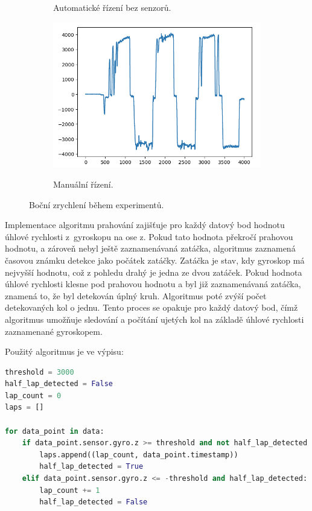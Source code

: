 \begin{figure}[!h]
\begin{subfigure}{.5\textwidth}
        \label{fig:LapsAuto}
        \caption{Automatické řízení bez senzorů.}
    \end{subfigure}
    \begin{subfigure}{.5\textwidth}
        \includegraphics[width = \textwidth]{Figures/LapManual.png}
        \label{fig:LapsManual}
        \caption{Manuální řízení.}
    \end{subfigure}
    \captionsetup{justification=centering}
    \caption{Boční zrychlení během experimentů.}
    \label{fig:Laps}
\end{figure}

Implementace algoritmu prahování zajišťuje pro každý datový bod hodnotu úhlové
rychlosti z~gyroskopu na ose z. Pokud tato hodnota překročí prahovou hodnotu, a
zároveň nebyl ještě zaznamenávaná zatáčka, algoritmus zaznamená časovou známku detekce
jako počátek zatáčky. Zatáčka je stav, kdy gyroskop má nejvyšší hodnotu, což z pohledu drahý je jedna ze dvou zatáček. Pokud hodnota úhlové rychlosti klesne pod prahovou hodnotu a
byl již zaznamenávaná zatáčka, znamená to, že byl detekován úplný kruh. Algoritmus
poté zvýší počet detekovaných kol o jednu. Tento proces se opakuje pro každý datový
bod, čímž algoritmus umožňuje sledování a počítání ujetých kol na základě úhlové rychlosti
zaznamenané gyroskopem. 

Použitý algoritmus je ve výpisu:


\begin{lstlisting}[language = python, caption = Počet kol, label = lst:countLap]
threshold = 3000
half_lap_detected = False
lap_count = 0
laps = []

for data_point in data:
    if data_point.sensor.gyro.z >= threshold and not half_lap_detected:
        laps.append((lap_count, data_point.timestamp))
        half_lap_detected = True
    elif data_point.sensor.gyro.z <= -threshold and half_lap_detected:
        lap_count += 1
        half_lap_detected = False
\end{lstlisting}

